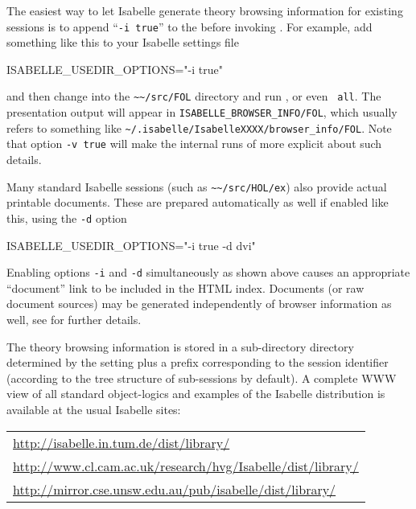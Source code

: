 \begin{isabellebody}
\begin{isamarkuptext}
  \medskip

  The easiest way to let Isabelle generate theory browsing information
  for existing sessions is to append ``\verb|-i true|'' to the
  \hyperlink{setting.ISABELLE-USEDIR-OPTIONS}{\mbox{}} before invoking \hyperlink{tool.make}{\mbox{}}.
  For example, add something like this to your Isabelle settings file

\begin{ttbox}
ISABELLE_USEDIR_OPTIONS="-i true"
\end{ttbox}

  and then change into the \verb|~~/src/FOL| directory and run
  \hyperlink{tool.make}{\mbox{}}, or even \hyperlink{tool.make}{\mbox{}}~\verb|all|.  The
  presentation output will appear in \verb|ISABELLE_BROWSER_INFO/FOL|, which usually refers to something like
  \verb|~/.isabelle/IsabelleXXXX/browser_info/FOL|.  Note that
  option \verb|-v true| will make the internal runs of \hyperlink{tool.usedir}{\mbox{}} more explicit about such details.

  Many standard Isabelle sessions (such as \verb|~~/src/HOL/ex|)
  also provide actual printable documents.  These are prepared
  automatically as well if enabled like this, using the \verb|-d| option
\begin{ttbox}
ISABELLE_USEDIR_OPTIONS="-i true -d dvi"
\end{ttbox}
  Enabling options \verb|-i| and \verb|-d|
  simultaneously as shown above causes an appropriate ``document''
  link to be included in the HTML index.  Documents (or raw document
  sources) may be generated independently of browser information as
  well, see  for further details.

  \bigskip The theory browsing information is stored in a
  sub-directory directory determined by the \hyperlink{setting.ISABELLE-BROWSER-INFO}{\mbox{}} setting plus a prefix corresponding to the
  session identifier (according to the tree structure of sub-sessions
  by default).  A complete WWW view of all standard object-logics and
  examples of the Isabelle distribution is available at the usual
  Isabelle sites:
  \begin{center}\small
  \begin{tabular}{l}
    \url{http://isabelle.in.tum.de/dist/library/} \\
    \url{http://www.cl.cam.ac.uk/research/hvg/Isabelle/dist/library/} \\
    \url{http://mirror.cse.unsw.edu.au/pub/isabelle/dist/library/} \\
  \end{tabular}
  \end{center}
  

\end{isamarkuptext}
\end{isabellebody}
